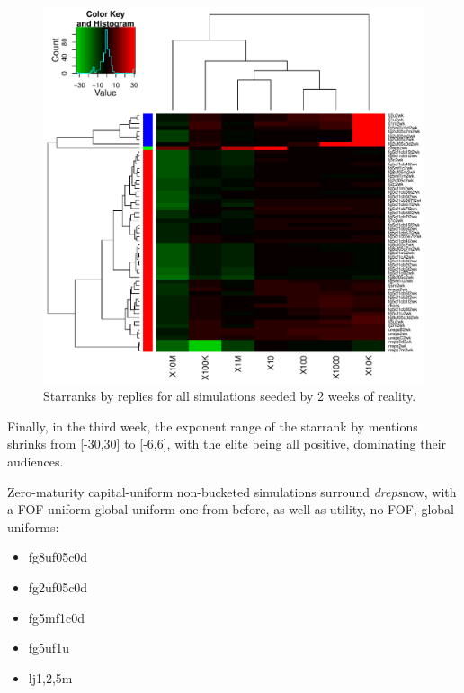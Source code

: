 \documentclass[10pt,oneside]{memoir}
\begin{document}
\begin{Spacing}{2}
\begin{figure}
\begin{center}
    \includegraphics{figures/crop/heatmap-sbucks-reps-star-med-medians-2wk}
    \caption{Starranks by replies for all simulations seeded by 2 weeks of reality.}
    \label{figure:heatmap-sbucks-reps-star-med-medians-2wk}
\end{center}
\end{figure}
Finally, in the third week, the exponent range of the starrank by mentions shrinks from [-30,30] to [-6,6], with the elite being all positive, dominating their audiences.


Zero-maturity capital-uniform non-bucketed simulations surround {\itshape dreps}now, with a FOF-uniform global uniform one from before, as well as utility, no-FOF, global uniforms:


\begin{itemize}


\item fg8uf05c0d

\item fg2uf05c0d

\item fg5mf1c0d

\item fg5uf1u

\item lj{1,2,5}m
\end{itemize}



\end{Spacing}
\end{document}
